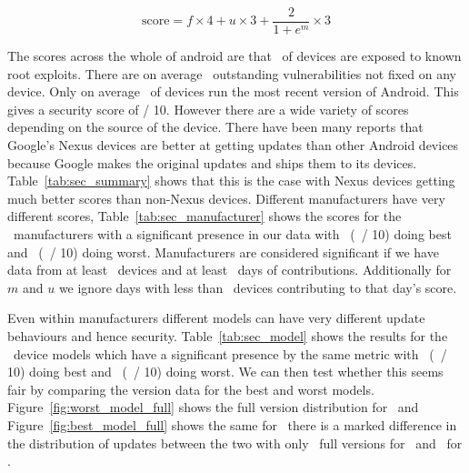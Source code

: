 \begin{equation}
\mathrm{score} = f\times 4 + u \times 3 + \frac{2}{1+e^m} \times 3 \label{eq:score}
\end{equation}

The scores across the whole of android are that \daMeanInsecurityPerc\ of devices are exposed to known root exploits.
There are on average \daMeanOutstandingVulnerabilities\ outstanding vulnerabilities not fixed on any device.
Only on average \daUpdatednessPerc\ of devices run the most recent version of Android.
This gives a security score of \daSecurityScore / 10.
\daTabSecScoressummary
However there are a wide variety of scores depending on the source of the device.
There have been many reports that Google's Nexus devices are better at getting updates than other Android devices because Google makes the original updates and ships them to its devices.
Table~\ref{tab:sec_summary} shows that this is the case with Nexus devices getting much better scores than non-Nexus devices.
\daTabSecScoresmanufacturer
Different manufacturers have very different scores, Table~\ref{tab:sec_manufacturer} shows the scores for the \daNumSigManufacturers\ manufacturers with a significant presence in our data with \daSecScoreBestmanufacturer\ (\daSecScoreBestmanufacturerScore\ / 10) doing best and \daSecScoreWorstmanufacturer\ (\daSecScoreWorstmanufacturerScore\ / 10) doing worst.
Manufacturers are considered significant if we have data from at least \daSigNumDevices\ devices and at least \daSigNumDeviceDays\ days of contributions.
Additionally for $m$ and $u$ we ignore days with less than \daSigNumDevicesDay\ devices contributing to that day's score.

\daTabSecScoresmodel
Even within manufacturers different models can have very different update behaviours and hence security.
Table~\ref{tab:sec_model} shows the results for the \daNumSigModels\ device models which have a significant presence by the same metric with \daSecScoreBestmodel\ (\daSecScoreBestmodelScore\ / 10) doing best and \daSecScoreWorstmodel\ (\daSecScoreWorstmodelScore\ / 10) doing worst.
We can then test whether this seems fair by comparing the version data for the best and worst models.
Figure~\ref{fig:worst_model_full} shows the full version distribution for \daSecScoreWorstmodel\ and Figure~\ref{fig:best_model_full} shows the same for \daSecScoreBestmodel\ there is a marked difference in the distribution of updates between the two with only \daSecScoreWorstmodelNumFullVersions\ full versions for \daSecScoreWorstmodel\ and \daSecScoreBestmodelNumFullVersions\ for \daSecScoreBestmodel.

